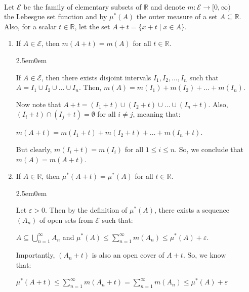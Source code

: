 \documentclass{book}
\newcommand{\exTwo}{%
   \color{RedViolet}%
   \fontsize{13}{15}\selectfont%
}
\newenvironment{myIndent}{%
   \begin{adjustwidth}{2.5em}{0em}%
}{%
   \end{adjustwidth}%
}
\newcommand{\mySepTwo}[1][.]{%
   {\noindent\color{#1}{\rule{6.5in}{0.5mm}}}\\%
}
\newcommand{\retTwo}{\hfill\bigbreak}
\begin{document}
\mySepTwo

Let $\mathcal{E}$ be the family of elementary subsets of $\mathbb{R}$ and denote $m: \mathcal{E} \rightarrow [0, \infty)$\\ the Lebesgue set function and by $\mu^*(A)$ the outer measure of a set $A \subseteq \mathbb{R}$.  \\Also, for a scalar $t \in \mathbb{R}$, let the set $A + t = \{x + t \mid x \in A\}$.

\begin{enumerate}
   \item If $A \in \mathcal{E}$, then $m(A + t) = m(A)$ for all $t \in \mathbb{R}$.
   {\begin{myIndent}\exTwo
      If $A \in \mathcal{E}$, then there exists disjoint intervals $I_1, I_2, \ldots, I_n$ such that\\ $A = I_1 \cup I_2 \cup \ldots \cup I_n$. Then, $m(A) = m(I_1) + m(I_2) + \ldots + m(I_n)$.\retTwo

      Now note that $A + t = (I_1 + t) \cup (I_2 + t) \cup \ldots \cup (I_n + t)$. Also,\\ $(I_i + t) \cap (I_j + t) = \emptyset$ for all $i \neq j$, meaning that:
      
      {\centering $m(A + t) = m(I_1 + t) + m(I_2 + t) + \ldots + m(I_n + t)$.\retTwo\par} 

      But clearly, $m(I_i + t) = m(I_i)$ for all $1 \leq i \leq n$. So, we conclude that\\ $m(A) = m(A + t)$.\retTwo
   \end{myIndent}}

   \item If $A \in \mathbb{R}$, then $\mu^*(A + t) = \mu^*(A)$ for all $t \in \mathbb{R}$.
   {\begin{myIndent}\exTwo
      Let $\varepsilon > 0$. Then by the definition of $\mu^*(A)$, there exists a sequence\\ $(A_n)$ of open sets from $\mathcal{E}$ such that:
      
      {\centering$A \subseteq \bigcup\limits_{n=1}^\infty A_n$ and $\mu^*(A) \leq \sum\limits_{n=1}^\infty m(A_n) \leq \mu^*(A) + \varepsilon$.\retTwo\par}

      Importantly, $(A_n + t)$ is also an open cover of $A + t$. So, we know\\ that:\\ [-20pt]
      
      {\centering $\mu^*(A + t) \leq \sum\limits_{n=1}^\infty m(A_n + t) = \sum\limits_{n=1}^\infty m(A_n) \leq \mu^*(A) + \varepsilon$\retTwo\par}


\end{myIndent}}
\end{enumerate}
\end{document}

